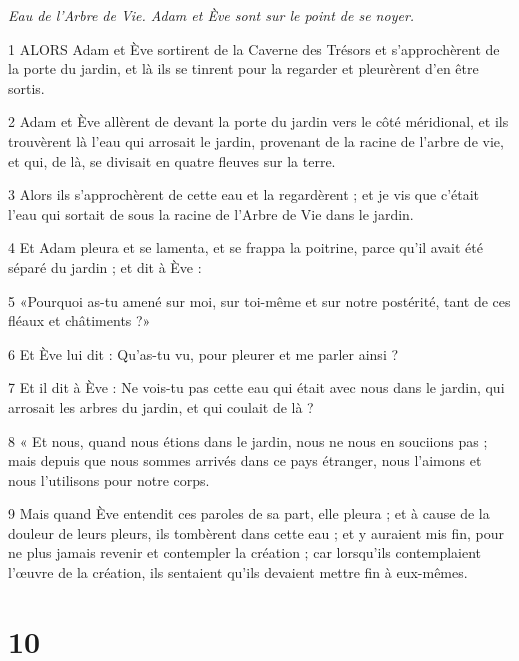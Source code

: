 \par \textit{Eau de l'Arbre de Vie. Adam et Ève sont sur le point de se noyer.}

\par 1 ALORS Adam et Ève sortirent de la Caverne des Trésors et s'approchèrent de la porte du jardin, et là ils se tinrent pour la regarder et pleurèrent d'en être sortis.

\par 2 Adam et Ève allèrent de devant la porte du jardin vers le côté méridional, et ils trouvèrent là l'eau qui arrosait le jardin, provenant de la racine de l'arbre de vie, et qui, de là, se divisait en quatre fleuves sur la terre.

\par 3 Alors ils s'approchèrent de cette eau et la regardèrent ; et je vis que c'était l'eau qui sortait de sous la racine de l'Arbre de Vie dans le jardin.

\par 4 Et Adam pleura et se lamenta, et se frappa la poitrine, parce qu'il avait été séparé du jardin ; et dit à Ève :

\par 5 «Pourquoi as-tu amené sur moi, sur toi-même et sur notre postérité, tant de ces fléaux et châtiments ?»

\par 6 Et Ève lui dit : Qu'as-tu vu, pour pleurer et me parler ainsi ?

\par 7 Et il dit à Ève : Ne vois-tu pas cette eau qui était avec nous dans le jardin, qui arrosait les arbres du jardin, et qui coulait de là ?

\par 8 « Et nous, quand nous étions dans le jardin, nous ne nous en souciions pas ; mais depuis que nous sommes arrivés dans ce pays étranger, nous l’aimons et nous l’utilisons pour notre corps.

\par 9 Mais quand Ève entendit ces paroles de sa part, elle pleura ; et à cause de la douleur de leurs pleurs, ils tombèrent dans cette eau ; et y auraient mis fin, pour ne plus jamais revenir et contempler la création ; car lorsqu'ils contemplaient l'œuvre de la création, ils sentaient qu'ils devaient mettre fin à eux-mêmes.

\chapter{10}

